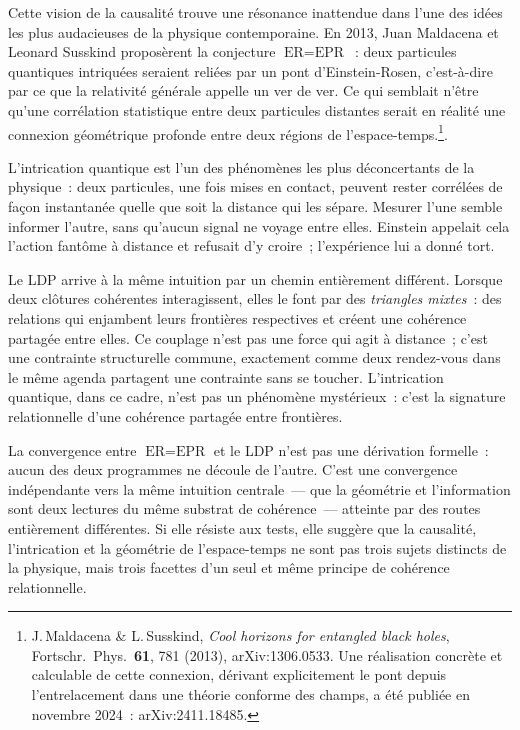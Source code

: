 \documentclass[12pt, a4paper, openright]{book}
\begin{document}
Cette vision de la causalité trouve une résonance inattendue dans l'une des idées les plus audacieuses de la physique contemporaine. En 2013, Juan Maldacena et Leonard Susskind proposèrent la conjecture $\text{ER} = \text{EPR}$~: deux particules quantiques intriquées seraient reliées par un pont d'Einstein-Rosen, c'est-à-dire par ce que la relativité générale appelle un ver de ver. Ce qui semblait n'être qu'une corrélation statistique entre deux particules distantes serait en réalité une connexion géométrique profonde entre deux régions de l'espace-temps.\footnote{J.\,Maldacena \& L.\,Susskind, \textit{Cool horizons for entangled black holes}, Fortschr.\ Phys.\ \textbf{61}, 781 (2013), arXiv:1306.0533. Une réalisation concrète et calculable de cette connexion, dérivant explicitement le pont depuis l'entrelacement dans une théorie conforme des champs, a été publiée en novembre 2024~: arXiv:2411.18485.}. 

\medskip

L'intrication quantique est l'un des phénomènes les plus déconcertants de la physique~: deux particules, une fois mises en contact, peuvent rester corrélées de façon instantanée quelle que soit la distance qui les sépare. Mesurer l'une semble \og informer\fg{} l'autre, sans qu'aucun signal ne voyage entre elles. Einstein appelait cela \og l'action fantôme à distance\fg{} et refusait d'y croire~; l'expérience lui a donné tort.

\medskip

Le LDP arrive à la même intuition par un chemin entièrement différent. Lorsque deux clôtures cohérentes interagissent, elles le font par des \emph{triangles mixtes}~: des relations qui enjambent leurs frontières respectives et créent une cohérence partagée entre elles. Ce couplage n'est pas une force qui agit à distance~; c'est une contrainte structurelle commune, exactement comme deux rendez-vous dans le même agenda partagent une contrainte sans se \og toucher\fg{}. L'intrication quantique, dans ce cadre, n'est pas un phénomène mystérieux~: c'est la signature relationnelle d'une cohérence partagée entre frontières.

\medskip

La convergence entre $\text{ER} = \text{EPR}$ et le LDP n'est pas une dérivation formelle~: aucun des deux programmes ne découle de l'autre. C'est une convergence indépendante vers la même intuition centrale~--- que la géométrie et l'information sont deux lectures du même substrat de cohérence~--- atteinte par des routes entièrement différentes. Si elle résiste aux tests, elle suggère que la causalité, l'intrication et la géométrie de l'espace-temps ne sont pas trois sujets distincts de la physique, mais trois facettes d'un seul et même principe de cohérence relationnelle.
\end{document}
